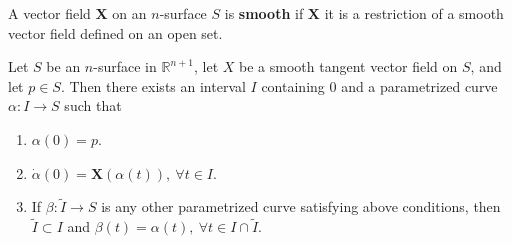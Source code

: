 \begin{definition}
	A vector field $\boldsymbol{X}$ on an $n$-surface $S$ is \textbf{smooth} if $\boldsymbol{X}$ it is a restriction of a smooth vector field defined on an open set.
\end{definition}

\begin{theorem}
	Let $S$ be an $n$-surface in $\mathbb{R}^{n+1}$, let $X$ be a smooth tangent vector field on $S$, and let $p \in S$. Then there exists an interval $I$ containing $0$ and a parametrized curve $\alpha : I \to S$ such that
	\begin{enumerate}
		\item $\alpha(0) = p$.
		\item $\dot\alpha(0) = \boldsymbol{X}(\alpha(t)),\ \forall t \in I$.
		\item If $\beta : \tilde{I} \to S$ is any other parametrized curve satisfying above conditions, then $\tilde{I} \subset I$ and $\beta(t) = \alpha(t),\ \forall t \in I \cap \tilde{I}$.
	\end{enumerate}
\end{theorem}
